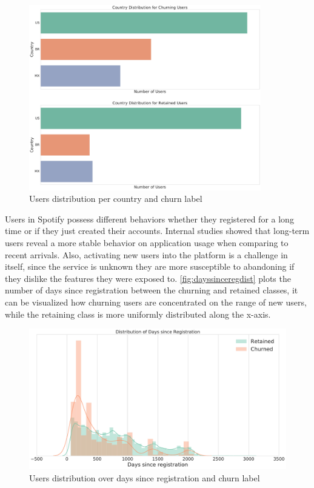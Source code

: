 \documentclass{kththesis}
\begin{document}
	\begin{figure}[H]
    \centering
    \includegraphics[width=0.9\textwidth,height=0.9\textheight,keepaspectratio]{figures/dist_reporting_country.pdf}
    \caption{Users distribution per country and churn label}
    \label{fig:countrydist}
	\end{figure}

Users in Spotify possess different behaviors whether they registered for a long time or if they just created their accounts. Internal studies showed that long-term users reveal a more stable behavior on application usage when comparing to recent arrivals. Also, activating new users into the platform is a challenge in itself, since the service is unknown they are more susceptible to abandoning if they dislike the features they were exposed to. \autoref{fig:dayssinceregdist} plots the number of days since registration between the churning and retained classes, it can be visualized how churning users are concentrated on the range of new users, while the retaining class is more uniformly distributed along the x-axis.

	\begin{figure}[h]
    \centering
    \includegraphics[width=1.0\textwidth,keepaspectratio]{figures/days_since_reg.pdf}
    \caption{Users distribution over days since registration and churn label}
    \label{fig:dayssinceregdist}
	\end{figure}
\end{document}
